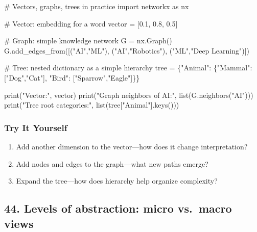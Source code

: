 \documentclass[
  letterpaper,
  DIV=11,
  numbers=noendperiod]{scrreprt}
\newenvironment{Shaded}{\begin{snugshade}}{\end{snugshade}}
\newcommand{\BuiltInTok}[1]{\textcolor[rgb]{0.00,0.23,0.31}{#1}}
\newcommand{\CommentTok}[1]{\textcolor[rgb]{0.37,0.37,0.37}{#1}}
\newcommand{\FloatTok}[1]{\textcolor[rgb]{0.68,0.00,0.00}{#1}}
\newcommand{\ImportTok}[1]{\textcolor[rgb]{0.00,0.46,0.62}{#1}}
\newcommand{\NormalTok}[1]{\textcolor[rgb]{0.00,0.23,0.31}{#1}}
\newcommand{\OperatorTok}[1]{\textcolor[rgb]{0.37,0.37,0.37}{#1}}
\newcommand{\StringTok}[1]{\textcolor[rgb]{0.13,0.47,0.30}{#1}}
\providecommand{\tightlist}{%
  \setlength{\itemsep}{0pt}\setlength{\parskip}{0pt}}
\begin{document}
\begin{Shaded}
\begin{Highlighting}[]
\CommentTok{\# Vectors, graphs, trees in practice}
\ImportTok{import}\NormalTok{ networkx }\ImportTok{as}\NormalTok{ nx}

\CommentTok{\# Vector: embedding for a word}
\NormalTok{vector }\OperatorTok{=}\NormalTok{ [}\FloatTok{0.1}\NormalTok{, }\FloatTok{0.8}\NormalTok{, }\FloatTok{0.5}\NormalTok{]}

\CommentTok{\# Graph: simple knowledge network}
\NormalTok{G }\OperatorTok{=}\NormalTok{ nx.Graph()}
\NormalTok{G.add\_edges\_from([(}\StringTok{"AI"}\NormalTok{,}\StringTok{"ML"}\NormalTok{), (}\StringTok{"AI"}\NormalTok{,}\StringTok{"Robotics"}\NormalTok{), (}\StringTok{"ML"}\NormalTok{,}\StringTok{"Deep Learning"}\NormalTok{)])}

\CommentTok{\# Tree: nested dictionary as a simple hierarchy}
\NormalTok{tree }\OperatorTok{=}\NormalTok{ \{}\StringTok{"Animal"}\NormalTok{: \{}\StringTok{"Mammal"}\NormalTok{: [}\StringTok{"Dog"}\NormalTok{,}\StringTok{"Cat"}\NormalTok{], }\StringTok{"Bird"}\NormalTok{: [}\StringTok{"Sparrow"}\NormalTok{,}\StringTok{"Eagle"}\NormalTok{]\}\}}

\BuiltInTok{print}\NormalTok{(}\StringTok{"Vector:"}\NormalTok{, vector)}
\BuiltInTok{print}\NormalTok{(}\StringTok{"Graph neighbors of AI:"}\NormalTok{, }\BuiltInTok{list}\NormalTok{(G.neighbors(}\StringTok{"AI"}\NormalTok{)))}
\BuiltInTok{print}\NormalTok{(}\StringTok{"Tree root categories:"}\NormalTok{, }\BuiltInTok{list}\NormalTok{(tree[}\StringTok{"Animal"}\NormalTok{].keys()))}
\end{Highlighting}
\end{Shaded}

\subsubsection{Try It Yourself}\label{try-it-yourself-42}

\begin{enumerate}
\def\labelenumi{\arabic{enumi}.}
\tightlist
\item
  Add another dimension to the vector---how does it change
  interpretation?
\item
  Add nodes and edges to the graph---what new paths emerge?
\item
  Expand the tree---how does hierarchy help organize complexity?
\end{enumerate}

\subsection{44. Levels of abstraction: micro vs.~macro
views}\label{levels-of-abstraction-micro-vs.-macro-views}
\end{document}
